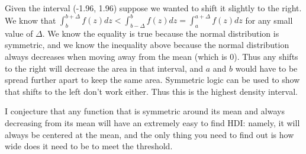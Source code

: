 \documentclass{article}
\begin{document}
Given the interval (-1.96, 1.96) suppose we wanted to shift it slightly to the right. We know that $\int_b^{b+\Delta}f(z)dz<\int_{b-\Delta}^bf(z)dz = \int_a^{a+\Delta}f(z)dz$ for any small value of $\Delta$. We know the equality is true because the normal distribution is symmetric, and we know the inequality above because the normal distribution always decreases when moving away from the mean (which is 0). Thus any shifts to the right will decrease the area in that interval, and $a$ and $b$ would have to be spread further apart to keep the same area. Symmetric logic can be used to show that shifts to the left don't work either. Thus this is the highest density interval.   

I conjecture that any function that is symmetric around its mean and always decreasing from its mean will have an extremely easy to find HDI: namely, it will always be centered at the mean, and the only thing you need to find out is how wide does it need to be to meet the threshold. 
\end{document}

